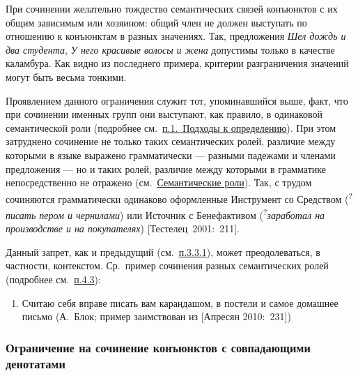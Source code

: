 При сочинении желательно тождество семантических связей конъюнктов с их
общим зависимым или хозяином: общий член не должен выступать по
отношению к конъюнктам в разных значениях. Так, предложения \textit{Шел
  дождь и два студента}, \textit{У него красивые волосы и жена} допустимы
только в качестве каламбура. Как видно из последнего примера, критерии
разграничения значений могут быть весьма тонкими.

Проявлением данного ограничения служит тот, упоминавшийся выше, факт,
что при сочинении именных групп они выступают, как правило, в одинаковой
семантической роли (подробнее см.~\underline{п.1.~Подходы к
  определению}). При этом затруднено сочинение не только таких
семантических ролей, различие между которыми в языке выражено
грамматически --- разными падежами и членами предложения --- но и таких
ролей, различие между которыми в грамматике непосредственно не отражено
(см.~\underline{Семантические роли}). Так, с трудом сочиняются
грамматически одинаково оформленные Инструмент со Средством
(\textsuperscript{?}\textit{писать пером и чернилами}) или Источник с
Бенефактивом (\textsuperscript{?}\textit{заработал на производстве и на
  покупателях}) {[}Тестелец~2001:~211{]}.

Данный запрет, как и предыдущий (см.~\underline{п.3.3.1}), может
преодолеваться, в частности, контекстом. Ср.~пример сочинения разных
семантических ролей (подробнее см.~\underline{п.4.3}):

\begin{enumerate}
  \def\labelenumi{(\arabic{enumi})}
  \setcounter{enumi}{16}
  \item
        Считаю себя вправе писать вам карандашом, в постели и самое домашнее
        письмо (А.~Блок; пример заимствован из {[}Апресян 2010:~231{]})
\end{enumerate}

\subsubsection{Ограничение на сочинение конъюнктов с совпадающими
  денотатами}\label{ux43eux433ux440ux430ux43dux438ux447ux435ux43dux438ux435-ux43dux430-ux441ux43eux447ux438ux43dux435ux43dux438ux435-ux43aux43eux43dux44aux44eux43dux43aux442ux43eux432-ux441-ux441ux43eux432ux43fux430ux434ux430ux44eux449ux438ux43cux438-ux434ux435ux43dux43eux442ux430ux442ux430ux43cux438}

